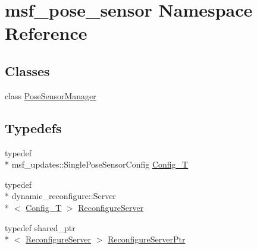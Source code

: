 \hypertarget{namespacemsf__pose__sensor}{\section{msf\-\_\-pose\-\_\-sensor Namespace Reference}
\label{namespacemsf__pose__sensor}
}
\subsection*{Classes}
\begin{DoxyCompactItemize}
\item 
class \hyperlink{classmsf__pose__sensor_1_1PoseSensorManager}{Pose\-Sensor\-Manager}
\end{DoxyCompactItemize}
\subsection*{Typedefs}
\begin{DoxyCompactItemize}
\item 
typedef \\*
msf\-\_\-updates\-::\-Single\-Pose\-Sensor\-Config \hyperlink{namespacemsf__pose__sensor_a1d993c8c6010718666c4e9dc159bd3dd}{Config\-\_\-\-T}
\item 
typedef \\*
dynamic\-\_\-reconfigure\-::\-Server\\*
$<$ \hyperlink{namespacemsf__pose__sensor_a1d993c8c6010718666c4e9dc159bd3dd}{Config\-\_\-\-T} $>$ \hyperlink{namespacemsf__pose__sensor_aa4588c7571ac356c58a2bc818dc3c09b}{Reconfigure\-Server}
\item 
typedef shared\-\_\-ptr\\*
$<$ \hyperlink{namespacemsf__pose__sensor_aa4588c7571ac356c58a2bc818dc3c09b}{Reconfigure\-Server} $>$ \hyperlink{namespacemsf__pose__sensor_a00a515ed2b3f3664f6db2ab912956d05}{Reconfigure\-Server\-Ptr}
\end{DoxyCompactItemize}


